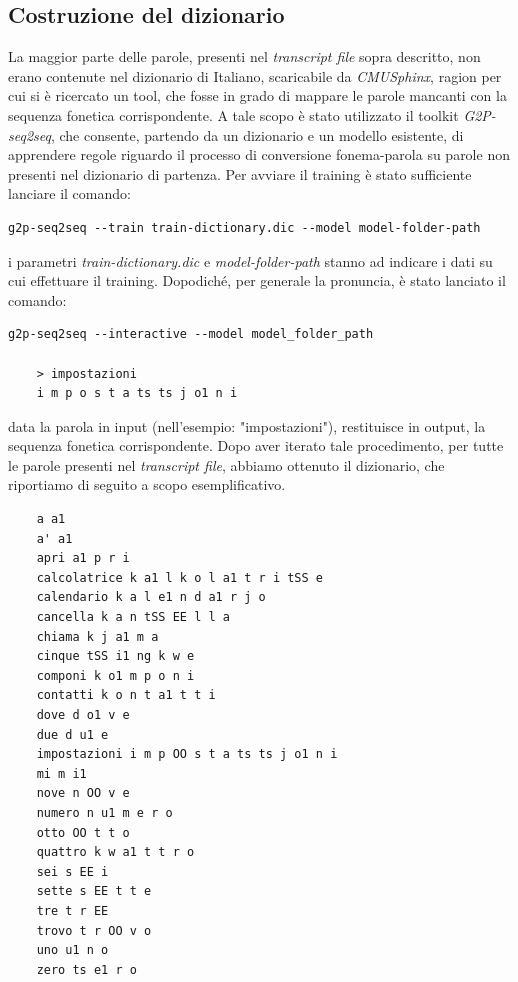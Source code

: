 \documentclass[12pt]{article}
\begin{document}
    \subsection{Costruzione del dizionario}    
    La maggior parte delle parole, presenti nel \textit{transcript file} sopra descritto, non erano contenute nel dizionario di Italiano, scaricabile da \textit{CMUSphinx}, ragion per cui si è ricercato un tool, che fosse in grado di mappare le parole mancanti con la sequenza fonetica corrispondente.
    A tale scopo è stato utilizzato il toolkit \textit{G2P-seq2seq}, che consente, partendo da un dizionario e un modello esistente, di apprendere regole riguardo il processo di conversione fonema-parola su parole non presenti nel dizionario di partenza.
    Per avviare il training è stato sufficiente lanciare il comando: 
    \begin{lstlisting}
g2p-seq2seq --train train-dictionary.dic --model model-folder-path
    \end{lstlisting}
    i parametri \textit{train-dictionary.dic} e \textit{model-folder-path} stanno ad indicare i dati su cui effettuare il training.
    Dopodiché, per generale la pronuncia, è stato lanciato il comando:
    \newpage
    \begin{lstlisting}
g2p-seq2seq --interactive --model model_folder_path
        
    > impostazioni
    i m p o s t a ts ts j o1 n i
    \end{lstlisting}
    data la parola in input (nell'esempio: "impostazioni"), restituisce in output, la sequenza fonetica corrispondente.
    Dopo aver iterato tale procedimento, per tutte le parole presenti nel \textit{transcript file}, abbiamo ottenuto il dizionario, che riportiamo di seguito a scopo esemplificativo.
    \begin{lstlisting}
    a a1
    a' a1
    apri a1 p r i
    calcolatrice k a1 l k o l a1 t r i tSS e
    calendario k a l e1 n d a1 r j o
    cancella k a n tSS EE l l a
    chiama k j a1 m a
    cinque tSS i1 ng k w e
    componi k o1 m p o n i
    contatti k o n t a1 t t i
    dove d o1 v e
    due d u1 e
    impostazioni i m p OO s t a ts ts j o1 n i
    mi m i1
    nove n OO v e
    numero n u1 m e r o
    otto OO t t o
    quattro k w a1 t t r o
    sei s EE i
    sette s EE t t e
    tre t r EE
    trovo t r OO v o
    uno u1 n o
    zero ts e1 r o 
    \end{lstlisting} 
    
\end{document}
